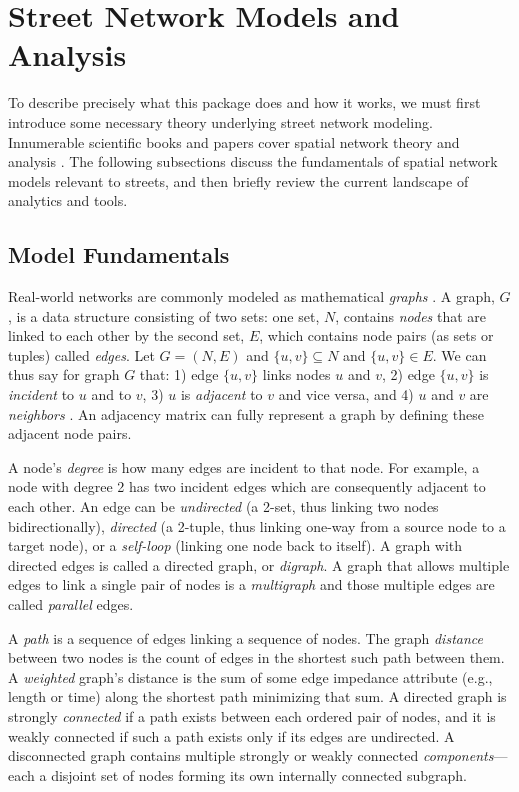 \documentclass[12pt,letterpaper]{article} %
\begin{document}
\section{Street Network Models and Analysis}

To describe precisely what this package does and how it works, we must first introduce some necessary theory underlying street network modeling. Innumerable scientific books and papers cover spatial network theory and analysis \citep[e.g.,][]{tinkler_graph_1979,barnes_graph_1983,gastner_spatial_2006,barthelemy_spatial_2011,ducruet_spatial_2014,fischer_spatial_2014,marshall_street_2018}. The following subsections discuss the fundamentals of spatial network models relevant to streets, and then briefly review the current landscape of analytics and tools.

\subsection{Model Fundamentals}

Real-world networks are commonly modeled as mathematical \textit{graphs} \citep{trudeau_introduction_1994, barthelemy_spatial_2022}. A graph, $G$, is a data structure consisting of two sets: one set, $N$, contains \textit{nodes} that are linked to each other by the second set, $E$, which contains node pairs (as sets or tuples) called \textit{edges}. Let $G = (N, E)$ and $\{u, v\} \subseteq N$ and $\{u, v\} \in E$. We can thus say for graph $G$ that: 1) edge $\{u, v\}$ links nodes $u$ and $v$, 2) edge $\{u, v\}$ is \textit{incident} to $u$ and to $v$, 3) $u$ is \textit{adjacent} to $v$ and vice versa, and 4) $u$ and $v$ are \textit{neighbors} \citep{newman_networks:_2010}. An adjacency matrix can fully represent a graph by defining these adjacent node pairs.

A node's \textit{degree} is how many edges are incident to that node. For example, a node with degree 2 has two incident edges which are consequently adjacent to each other. An edge can be \textit{undirected} (a 2-set, thus linking two nodes bidirectionally), \textit{directed} (a 2-tuple, thus linking one-way from a source node to a target node), or a \textit{self-loop} (linking one node back to itself). A graph with directed edges is called a directed graph, or \textit{digraph}. A graph that allows multiple edges to link a single pair of nodes is a \textit{multigraph} and those multiple edges are called \textit{parallel} edges.

A \textit{path} is a sequence of edges linking a sequence of nodes. The graph \textit{distance} between two nodes is the count of edges in the shortest such path between them. A \textit{weighted} graph's distance is the sum of some edge impedance attribute (e.g., length or time) along the shortest path minimizing that sum. A directed graph is strongly \textit{connected} if a path exists between each ordered pair of nodes, and it is weakly connected if such a path exists only if its edges are undirected. A disconnected graph contains multiple strongly or weakly connected \textit{components}---each a disjoint set of nodes forming its own internally connected subgraph.
\end{document}
